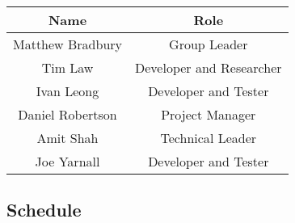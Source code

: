 \begin{table}[H]
\centering
	\begin{tabular}{| c | c |}
		\hline
		Name & Role\\
		\hline
		Matthew Bradbury & Group Leader\\
		Tim Law & Developer and Researcher\\
		Ivan Leong & Developer and Tester\\
		Daniel Robertson & Project Manager\\
		Amit Shah & Technical Leader\\
		Joe Yarnall & Developer and Tester\\
		\hline
	\end{tabular}
\end{table}


\subsection{Schedule}


